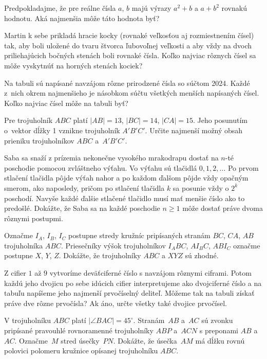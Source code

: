 {%
Predpokladajme, že pre reálne čísla $a$, $b$ majú výrazy $a^2+b$ a $a+b^2$ rovnakú hodnotu. Aká najmenšia môže táto hodnota byť?
}

{%
Martin k sebe prikladá hracie kocky (rovnaké veľkosťou aj rozmiestnením čísel) tak, aby boli uložené do tvaru štvorca ľubovoľnej veľkosti a aby vždy na dvoch priliehajúcich bočných stenách boli rovnaké čísla. Koľko najviac rôznych čísel sa môže vyskytnúť na horných stenách kociek?
%
}

{%
Na tabuli sú napísané navzájom rôzne prirodzené čísla so súčtom 2024. Každé z~nich okrem najmenšieho je násobkom súčtu všetkých menších napísaných čísel. Koľko najviac čísel môže na tabuli byť?
}

{%
Pre trojuholník $ABC$ platí $|AB|=13$, $|BC|=14$, $|CA|=15$. Jeho posunutím o~vektor dĺžky 1 vznikne trojuholník $A'B'C'$. Určite najmenší možný obsah prieniku trojuholníkov $ABC$ a~$A'B'C'$.
%
}

{%
Saba sa snaží z prízemia nekonečne vysokého mrakodrapu dostať na $n$-té poschodie pomocou zvláštneho výťahu.
Vo výťahu sú tlačidlá $0,1,2,\dots$ Po prvom stlačení tlačidla pôjde výťah nahor a po každom ďalšom pôjde vždy opačným smerom, ako naposledy, pričom po stlačení tlačidla $k$ sa posunie vždy o $2^k$ poschodí. Navyše každé ďalšie stlačené tlačidlo musí mať menšie číslo ako to predošlé.
Dokážte, že Saba sa na každé poschodie $n\ge 1$ môže dostať práve dvoma rôznymi postupmi.
}

{%
Označme $I_A$, $I_B$, $I_C$ postupne stredy kružníc pripísaných stranám $BC$, $CA$, $AB$ trojuholníka $ABC$. Priesečníky výšok trojuholníkov $I_ABC$, $AI_BC$, $ABI_C$ označme postupne $X$, $Y$, $Z$. Dokážte, že trojuholníky $ABC$ a $XYZ$ sú zhodné.
}

{%
Z cifier $1$ až $9$ vytvoríme deväťciferné číslo s navzájom rôznymi ciframi. Potom každú jeho dvojicu po sebe idúcich cifier interpretujeme ako dvojciferné číslo a na tabuľu napíšeme jeho najmenší prvočíselný deliteľ. Môžeme tak na tabuli získať práve dve rôzne prvočísla? Ak áno, určte všetky také dvojice prvočísel.
}

{%
V trojuholníku $ABC$ platí $|\angle BAC|=45^\circ$. Stranám~$AB$ a~$AC$ sú zvonku pripísané pravouhlé rovnoramenné trojuholníky $ABP$ a~$ACN$ s preponami $AB$ a $AC$. Označme~$M$ stred úsečky~$PN$. Dokážte, že úsečka~$AM$ má dĺžku rovnú polovici polomeru kružnice opísanej trojuholníku $ABC$.
%
}

